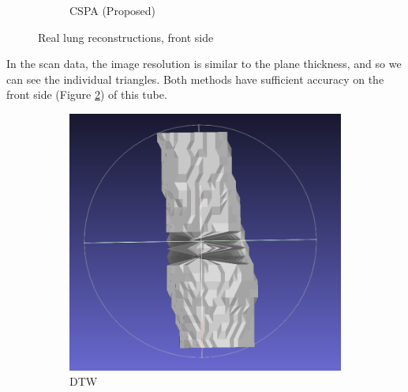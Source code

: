 \documentclass[11p, titlepage]{article}
\begin{document}
\begin{figure}[h!]
\begin{subfigure}[b]{0.45\textwidth}
         \caption{CSPA (Proposed)}
         \label{fig:cspa50_real}
     \end{subfigure}
        \caption{Real lung reconstructions, front side}
        \label{fig:real_reconstructions}
\end{figure}

In the scan data, the image resolution is similar to the plane thickness, and so we can see the individual triangles. Both methods have sufficient accuracy on the front side (Figure \ref{fig:real_reconstructions}) of this tube.

\begin{figure}[h!]
     \centering
     \begin{subfigure}[b]{0.45\textwidth}
         \centering
         \includegraphics[width=\textwidth]{reconstructions/dtw-real-back}
         \caption{DTW}
         \label{fig:dtw_real_back}
     \end{subfigure}
     \hfill
     \begin{subfigure}[b]{0.45\textwidth}
         \centering

\end{subfigure}
\end{figure}
\end{document}
